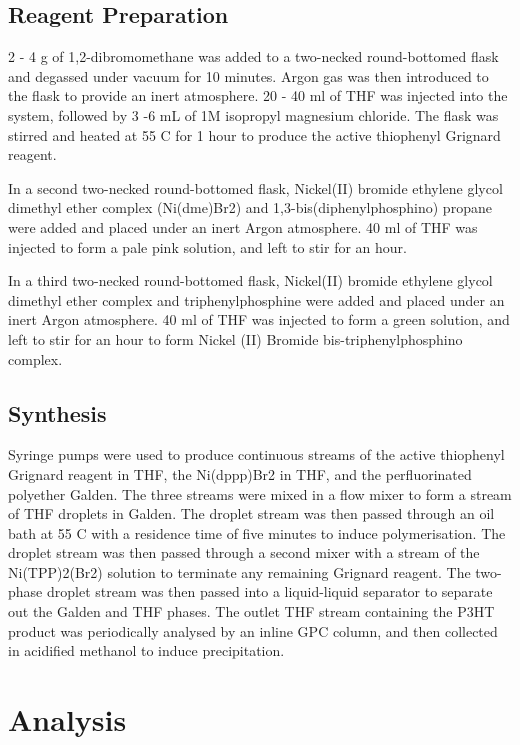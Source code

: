 \subsection{Reagent Preparation}

2 - 4 g of 1,2-dibromomethane was added to a two-necked round-bottomed flask and degassed under vacuum for 10 minutes. Argon gas was then introduced to the flask to provide an inert atmosphere. 20 - 40 ml of THF was injected into the system, followed by 3 -6 mL of 1M isopropyl magnesium chloride. The flask was stirred and heated at 55 C for 1 hour to produce the active thiophenyl Grignard reagent.

In a second two-necked round-bottomed flask, Nickel(II) bromide ethylene glycol dimethyl ether complex (Ni(dme)Br2) and 1,3-bis(diphenylphosphino) propane were added and placed under an inert Argon atmosphere. 40 ml of THF was injected to form a pale pink solution, and left to stir for an hour.

In a third two-necked round-bottomed flask, Nickel(II) bromide ethylene glycol dimethyl ether complex and triphenylphosphine were added and placed under an inert Argon atmosphere. 40 ml of THF was injected to form a green solution, and left to stir for an hour to form Nickel (II) Bromide bis-triphenylphosphino complex.

\subsection{Synthesis}

Syringe pumps were used to produce continuous streams of the active thiophenyl Grignard reagent in THF, the Ni(dppp)Br2 in THF, and the perfluorinated polyether Galden. The three streams were mixed in a flow mixer to form a stream of THF droplets in Galden. The droplet stream was then passed through an oil bath at 55 C with a residence time of five minutes to induce polymerisation. The droplet stream was then passed through a second mixer with a stream of the Ni(TPP)2(Br2) solution to terminate any remaining Grignard reagent. The two-phase droplet stream was then passed into a liquid-liquid separator to separate out the Galden and THF phases. The outlet THF stream containing the P3HT product was periodically analysed by an inline GPC column, and then collected in acidified methanol to induce precipitation.

\section{Analysis}

